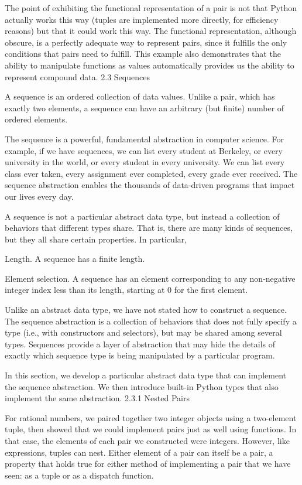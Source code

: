 \documentclass[letterpaper,10pt,dvipdfmx]{sphinxmanual}
\begin{document}
The point of exhibiting the functional representation of a pair is not that Python actually works this way (tuples are implemented more directly, for efficiency reasons) but that it could work this way. The functional representation, although obscure, is a perfectly adequate way to represent pairs, since it fulfills the only conditions that pairs need to fulfill. This example also demonstrates that the ability to manipulate functions as values automatically provides us the ability to represent compound data.
2.3   Sequences

A sequence is an ordered collection of data values. Unlike a pair, which has exactly two elements, a sequence can have an arbitrary (but finite) number of ordered elements.

The sequence is a powerful, fundamental abstraction in computer science. For example, if we have sequences, we can list every student at Berkeley, or every university in the world, or every student in every university. We can list every class ever taken, every assignment ever completed, every grade ever received. The sequence abstraction enables the thousands of data-driven programs that impact our lives every day.

A sequence is not a particular abstract data type, but instead a collection of behaviors that different types share. That is, there are many kinds of sequences, but they all share certain properties. In particular,

Length. A sequence has a finite length.

Element selection. A sequence has an element corresponding to any non-negative integer index less than its length, starting at 0 for the first element.

Unlike an abstract data type, we have not stated how to construct a sequence. The sequence abstraction is a collection of behaviors that does not fully specify a type (i.e., with constructors and selectors), but may be shared among several types. Sequences provide a layer of abstraction that may hide the details of exactly which sequence type is being manipulated by a particular program.

In this section, we develop a particular abstract data type that can implement the sequence abstraction. We then introduce built-in Python types that also implement the same abstraction.
2.3.1   Nested Pairs

For rational numbers, we paired together two integer objects using a two-element tuple, then showed that we could implement pairs just as well using functions. In that case, the elements of each pair we constructed were integers. However, like expressions, tuples can nest. Either element of a pair can itself be a pair, a property that holds true for either method of implementing a pair that we have seen: as a tuple or as a dispatch function.
\end{document}
